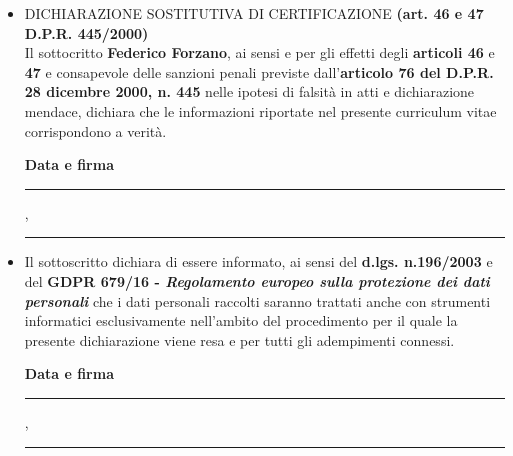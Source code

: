 \documentclass[
    italian,
    a4paper,
    nologo,
    notitle
]{europasscv}
\begin{document}
\textcolor{ecvtextcolor}{
    \begin{itemize}
        \selectfont
        \item DICHIARAZIONE SOSTITUTIVA DI CERTIFICAZIONE \textbf{(art. 46 e 47 D.P.R. 445/2000)}\\
              Il sottocritto \textbf{Federico Forzano}, ai sensi e per gli effetti degli \textbf{articoli 46} e \textbf{47} e
              consapevole delle sanzioni penali previste dall'\textbf{articolo 76 del D.P.R. 28 dicembre 2000, n. 445} nelle ipotesi di
              falsità in atti e dichiarazione mendace, dichiara che le informazioni riportate nel presente curriculum vitae
              corrispondono a verità.
              \begin{flushright}
                  \textbf{Data e firma}\vspace{0.5cm}\\
                  \rule{0.2\textwidth}{0.4pt}, \rule{0.3\textwidth}{0.4pt}
              \end{flushright}
        \item Il sottoscritto dichiara di essere informato, ai sensi del \textbf{d.lgs. n.196/2003} e
              del \textbf{GDPR 679/16 - \emph{Regolamento europeo sulla protezione dei dati personali}} che i dati personali raccolti saranno trattati anche
              con strumenti informatici esclusivamente nell'ambito del procedimento per il
              quale la presente dichiarazione viene resa e per tutti gli adempimenti connessi.
              \begin{flushright}
                  \textbf{Data e firma}\vspace{0.5cm}\\
                  \rule{0.2\textwidth}{0.4pt}, \rule{0.3\textwidth}{0.4pt}
              \end{flushright}
    \end{itemize}
}
\end{document}
